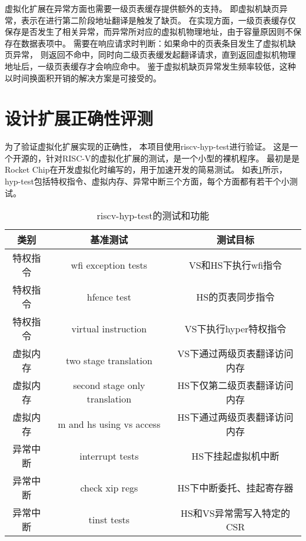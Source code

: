 虚拟化扩展在异常方面也需要一级页表缓存提供额外的支持。
即虚拟机缺页异常，表示在进行第二阶段地址翻译是触发了缺页。
在实现方面，一级页表缓存仅保存是否发生了相关异常，而异常所对应的虚拟机物理地址，由于容量原因则不保存在数据表项中。
需要在响应请求时判断：如果命中的页表条目发生了虚拟机缺页异常，
则返回不命中，同时向二级页表缓发起翻译请求，直到返回虚拟机物理地址后，一级页表缓存才会响应命中。
鉴于虚拟机缺页异常发生频率较低，这种以时间换面积开销的解决方案是可接受的。

\section{设计扩展正确性评测}
为了验证虚拟化扩展实现的正确性，
本项目使用riscv-hyp-test\cite{itco2022rocket}进行验证。
这是一个开源的，针对RISC-V的虚拟化扩展的测试，是一个小型的裸机程序。
最初是是Rocket Chip在开发虚拟化时编写的，用于加速开发的简易测试。
如表\ref{tab:hyp-test}所示，
hyp-test包括特权指令、虚拟内存、异常中断三个方面，每个方面都有若干个小测试。

\begin{table}
    \centering
    \caption{riscv-hyp-test的测试和功能}
    \begin{tabular}{ccc}
        \toprule
        类别   & 基准测试                          & 测试目标             \\
        \midrule
        特权指令 & wfi exception tests           & VS和HS下执行wfi指令    \\
        特权指令 & hfence test                   & HS的页表同步指令        \\
        特权指令 & virtual instruction           & VS下执行hyper特权指令   \\
        虚拟内存 & two stage translation         & VS下通过两级页表翻译访问内存  \\
        虚拟内存 & second stage only translation & HS下仅第二级页表翻译访问内存  \\
        虚拟内存 & m and hs using vs access      & HS下通过两级页表翻译访问内存  \\
        异常中断 & interrupt tests               & HS下挂起虚拟机中断       \\
        异常中断 & check xip regs                & HS下中断委托、挂起寄存器    \\
        异常中断 & tinst tests                   & HS和VS异常需写入特定的CSR \\
        \bottomrule
    \end{tabular}
    \label{tab:hyp-test}
\end{table}

